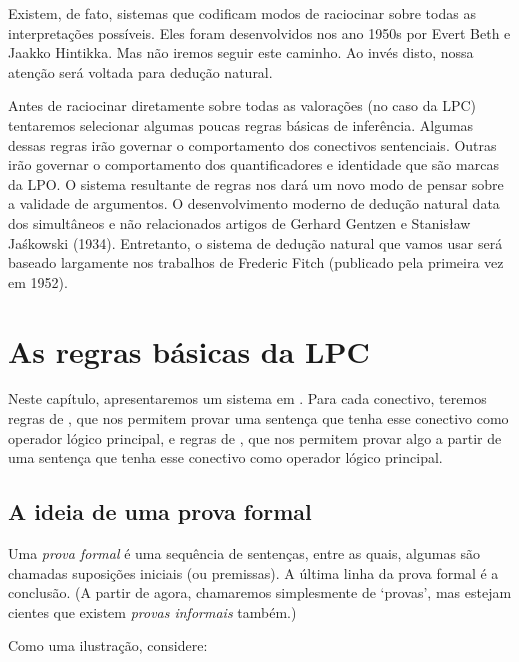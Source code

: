 Existem, de fato, sistemas que  codificam modos de raciocinar sobre todas as interpretações possíveis. Eles foram desenvolvidos nos ano 1950s por Evert Beth e  Jaakko Hintikka.  Mas não iremos seguir este caminho.  Ao invés disto,  nossa atenção será voltada para dedução natural. 
 
Antes de raciocinar diretamente sobre todas as valorações  (no caso da LPC) tentaremos selecionar algumas poucas regras básicas de inferência.  Algumas dessas regras  irão governar o comportamento dos conectivos sentenciais. Outras irão governar o comportamento dos quantificadores e identidade que são marcas da LPO.  
O sistema resultante de regras nos dará um novo modo de pensar sobre a validade de argumentos.  O desenvolvimento moderno de dedução  natural data dos simultâneos  e não relacionados artigos de  
 Gerhard Gentzen e Stanis\l{}aw Ja\'{s}kowski (1934).  Entretanto, o sistema de dedução natural que vamos usar  será  baseado largamente nos trabalhos de Frederic Fitch (publicado pela primeira vez em 1952). 

\chapter{As regras básicas da LPC}\label{s:BasicTFL}

 

Neste capítulo,  apresentaremos um sistema em  . Para cada conectivo, teremos regras de  ,  que nos permitem provar uma sentença que tenha esse conectivo como operador lógico principal, e regras de , que nos permitem provar algo a partir de uma sentença que tenha esse conectivo como operador lógico principal. 


\section{A  ideia de uma prova formal}
Uma \emph{prova formal} é uma sequência de sentenças, entre as quais, algumas são  chamadas suposições iniciais (ou premissas).  A última linha da prova formal é a conclusão.  (A partir de agora, chamaremos simplesmente de `provas',  mas estejam cientes que existem \emph{provas informais} também.)

Como uma ilustração, considere: 
 
